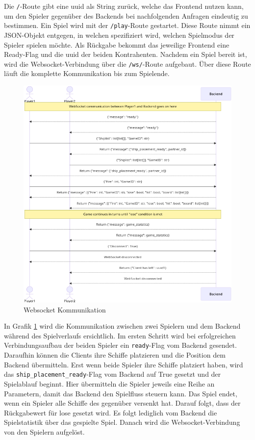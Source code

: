 \documentclass[a4paper, 10pt, conference]{IEEEtran}
\begin{document}
Die \texttt{/}-Route gibt eine \ac{uuid} als String zurück, welche das Frontend nutzen kann, um den Spieler gegenüber des Backends bei nachfolgenden Anfragen eindeutig zu bestimmen. Ein Spiel wird mit der \texttt{/play}-Route gestartet. Diese Route nimmt ein JSON-Objekt entgegen, in welchen spezifiziert wird, welchen Spielmodus der Spieler spielen möchte. Als Rückgabe bekommt das jeweilige Frontend eine Ready-Flag und die \ac{uuid} der beiden Kontrahenten. Nachdem ein Spiel bereit ist, wird die Websocket-Verbindung über die \texttt{/ws/}-Route aufgebaut. Über diese Route läuft die komplette Kommunikation bis zum Spielende.

\begin{figure}[thp]
    \centering
    \includegraphics[width=\linewidth]{websocket_comm}
    \caption{Websocket Kommunikation}
    \label{fig:websocket_comm}
\end{figure}

In Grafik \ref{fig:websocket_comm} wird die Kommunikation zwischen zwei Spielern und dem Backend während des Spielverlaufs ersichtlich. Im ersten Schritt wird bei erfolgreichen Verbindungsaufbau der beiden Spieler ein \texttt{ready}-Flag vom Backend gesendet. Daraufhin können die Clients ihre Schiffe platzieren und die Position dem Backend übermitteln. Erst wenn beide Spieler ihre Schiffe platziert haben, wird das \texttt{ship\_placement\_ready}-Flag vom Backend auf True gesetzt und der Spielablauf beginnt. Hier übermitteln die Spieler jeweils eine Reihe an Parametern, damit das Backend den Spielfluss steuern kann. Das Spiel endet, wenn ein Spieler alle Schiffe des gegenüber versenkt hat. Darauf folgt, dass der Rückgabewert für lose gesetzt wird. Es folgt lediglich vom Backend die Spielstatistik über das gespielte Spiel. Danach wird die Websocket-Verbindung von den Spielern aufgelöst.
\end{document}

